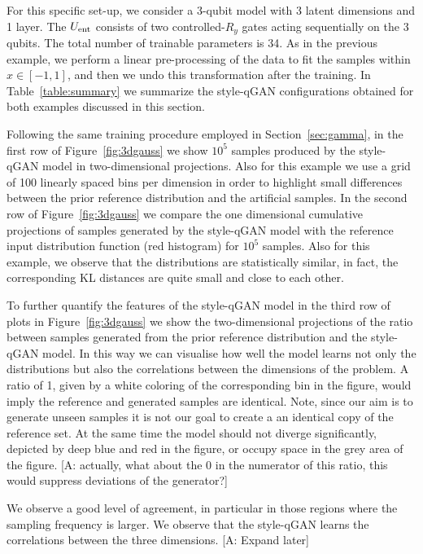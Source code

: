 \documentclass[twocolumn,preprintnumbers,superscriptaddress]{revtex4-2}
\newcommand{\commentAF}[1]{{\color{cyan} {[A: #1]}}}
\begin{document}
For this specific set-up, we consider a 3-qubit model with 3 latent dimensions and
1 layer. The $U_{\rm ent}$ consists of two controlled-$R_{y}$ gates acting sequentially on the 3 qubits.
The total number of trainable parameters is 34. As in the previous example, we perform a linear pre-processing of the data to fit the samples within $x \in [-1, 1]$, and then we undo this transformation after the training. In Table~\ref{table:summary}
we summarize the style-qGAN configurations obtained for both examples discussed in
this section.

Following the same training procedure employed in Section~\ref{sec:gamma}, in
the first row of Figure~\ref{fig:3dgauss} we show $10^5$ samples produced by the
style-qGAN model in two-dimensional projections. Also for this example we use a
grid of 100 linearly spaced bins per dimension in order to highlight small
differences between the prior reference distribution and the artificial samples.
%
In the second row of Figure~\ref{fig:3dgauss} we compare the one dimensional
cumulative projections of samples generated by the style-qGAN model with the
reference input distribution function (red histogram) for $10^5$ samples. Also
for this example, we observe that the distributions are statistically similar,
in fact, the corresponding KL distances are quite small and close to each other.

To further quantify the features of the style-qGAN model in the third row of plots in Figure~\ref{fig:3dgauss} we show the two-dimensional projections of the ratio between samples generated from the prior reference distribution and the style-qGAN model.
In this way we can visualise how well the model learns not only the distributions but also the correlations between the dimensions of the problem. A ratio of 1, given by a white coloring of the corresponding bin in the figure, would imply the reference and generated samples are identical. Note, since our aim is to generate unseen samples it is not our goal to create a an identical copy of the reference set. At the same time the model should not diverge significantly, depicted by deep blue and red in the figure, or occupy space in the grey area of the figure. 
\commentAF{actually, what about the 0 in the numerator of this ratio, this would suppress deviations of the generator?}

We observe a good level of agreement, in particular in those regions where the
sampling frequency is larger. We observe that the style-qGAN learns the correlations
between the three dimensions.
\commentAF{Expand later}
\end{document}
